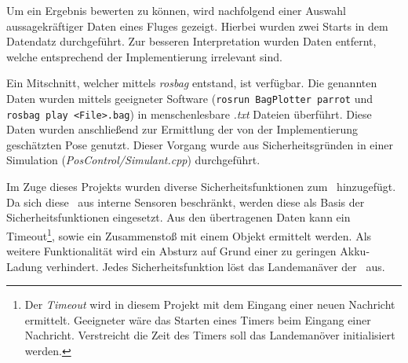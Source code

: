 
Um ein Ergebnis bewerten zu können, wird nachfolgend einer Auswahl aussagekräftiger Daten eines Fluges gezeigt. Hierbei wurden zwei Starts in dem Datendatz durchgeführt. Zur besseren Interpretation wurden Daten entfernt, welche entsprechend der Implementierung irrelevant sind.

Ein Mitschnitt, welcher mittels \textit{rosbag} entstand, ist verfügbar. Die genannten Daten wurden mittels geeigneter Software (\texttt{rosrun BagPlotter parrot} und \texttt{rosbag play <File>.bag}) in menschenlesbare \textit{.txt} Dateien überführt. Diese Daten wurden anschließend zur Ermittlung der von der Implementierung geschätzten Pose genutzt. Dieser Vorgang wurde aus Sicherheitsgründen in einer Simulation (\textit{PosControl/Simulant.cpp}) durchgeführt.




Im Zuge dieses Projekts wurden diverse Sicherheitsfunktionen zum \Quad\ hinzugefügt. Da sich diese \Arbeit\ aus interne Sensoren beschränkt, werden diese als Basis der Sicherheitsfunktionen eingesetzt.
Aus den übertragenen Daten kann ein Timeout\footnote{Der \textit{Timeout} wird in diesem Projekt mit dem Eingang einer neuen Nachricht ermittelt. Geeigneter wäre das Starten eines Timers beim Eingang einer Nachricht. Verstreicht die Zeit des Timers soll das Landemanöver initialisiert werden.}, sowie ein Zusammenstoß mit einem Objekt ermittelt werden. Als weitere Funktionalität wird ein Absturz auf Grund einer zu geringen Akku-Ladung verhindert. Jedes Sicherheitsfunktion löst das Landemanäver der \Ar\ aus.
















